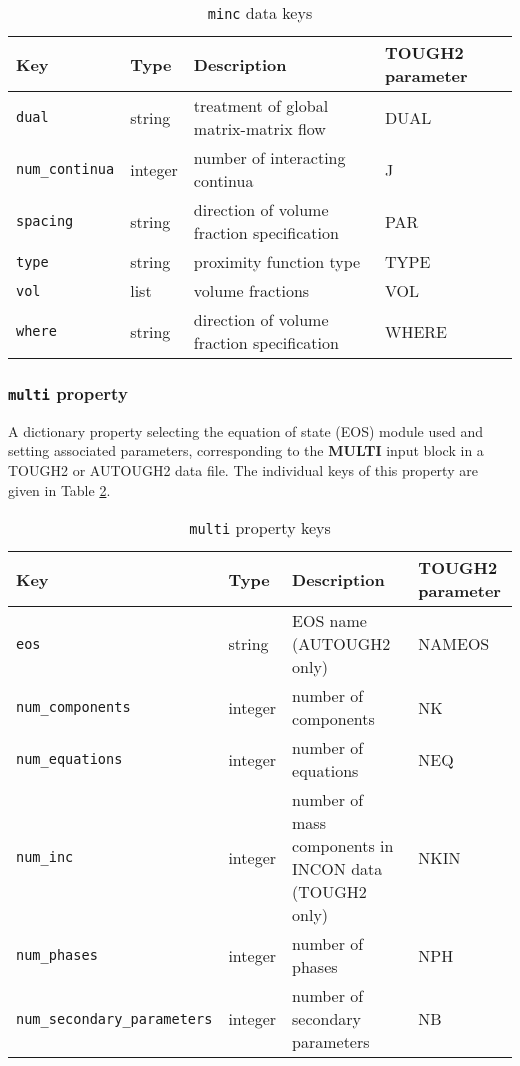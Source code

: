\begin{table}
  \begin{center}
    \begin{tabular}{|l|l|l|l|}
      \hline
      \textbf{Key} & \textbf{Type} & \textbf{Description} & \textbf{TOUGH2 parameter}\\
      \hline
      \texttt{dual} & string & treatment of global matrix-matrix flow & DUAL\\
      \texttt{num\_continua} & integer & number of interacting continua & J\\
      \texttt{spacing} & string & direction of volume fraction specification & PAR\\
      \texttt{type} & string & proximity function type & TYPE\\
      \texttt{vol} & list & volume fractions & VOL\\
      \texttt{where} & string & direction of volume fraction specification & WHERE\\
      \hline
    \end{tabular}
    \caption{\texttt{minc} data keys}
    \label{tb:minc}
  \end{center}
\end{table}

\begin{snugshade}
\subsubsection{\texttt{multi} property}
\end{snugshade}
\label{sec:t2data:multi}

A dictionary property selecting the equation of state (EOS) module used and setting associated parameters, corresponding to the \textbf{MULTI} input block in a TOUGH2 or AUTOUGH2 data file.  The individual keys of this property are given in Table \ref{tb:multi}.

\begin{table}
  \begin{center}
    \begin{tabular}{|l|l|p{37mm}|p{23mm}|}
      \hline
      \textbf{Key} & \textbf{Type} & \textbf{Description} & \textbf{TOUGH2 parameter}\\
      \hline
      \texttt{eos} & string & EOS name (AUTOUGH2 only) & NAMEOS\\
      \texttt{num\_components} & integer & number of components & NK\\
      \texttt{num\_equations} & integer & number of equations & NEQ\\
      \texttt{num\_inc} & integer & number of mass components in INCON data (TOUGH2 only) & NKIN\\
      \texttt{num\_phases} & integer & number of phases & NPH\\
      \texttt{num\_secondary\_parameters} & integer & number of secondary parameters & NB\\
      \hline
    \end{tabular}
    \caption{\texttt{multi} property keys}
    \label{tb:multi}
  \end{center}
\end{table}

